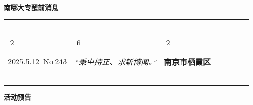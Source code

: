 \documentclass[letterpaper, 12pt]{article}
\begin{document}
\begin{center}
    \Huge\textbf{南哪大专醒前消息}
\end{center}
\vspace{4mm}
\hrule
\renewcommand\tabularxcolumn[1]{m{#1}}
\begin{tabularx}{\textwidth}{>{\hsize.2\hsize}X>{\hsize.6\hsize}X>{\hsize.2\hsize}X}
    \begin{flushleft}
        2025.5.12\, No.243
    \end{flushleft}
    &
    \begin{center}
        \textit{“秉中持正、求新博闻。”}
    \end{center}
    &
    \begin{flushright}
        \textbf{南京市栖霞区}
    \end{flushright}
\end{tabularx}
\vspace{-3.5mm}
\hrule
\vspace{4mm}
\centerline{\huge\textbf{活动预告}}
\end{document}
